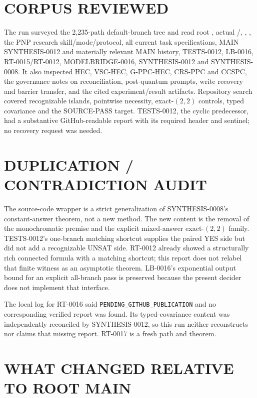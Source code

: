 \documentclass[11pt]{article}
\begin{document}
\section{CORPUS REVIEWED}

The run surveyed the 2,235-path default-branch tree and read root
, actual /, ,
, the PNP research skill/mode/protocol, all current task
specifications, MAIN SYNTHESIS-0012 and materially relevant MAIN history,
TESTS-0012, LB-0016, RT-0015/RT-0012, MODELBRIDGE-0016, SYNTHESIS-0012 and
SYNTHESIS-0008.  It also inspected HEC, VSC-HEC, G-PPC-HEC, CRS-PPC and CCSPC,
the governance notes on reconciliation, post-quantum prompts, write recovery
and barrier transfer, and the cited experiment/result artifacts.  Repository
search covered recognizable islands, pointwise necessity, exact-$(2,2)$
controls, typed covariance and the SOURCE-PASS target.  TESTS-0012, the cyclic
predecessor, had a substantive GitHub-readable report with its required header
and sentinel; no recovery request was needed.

\section{DUPLICATION / CONTRADICTION AUDIT}

The source-code wrapper is a strict generalization of SYNTHESIS-0008's
constant-answer theorem, not a new method.  The new content is the removal of
the monochromatic premise and the explicit mixed-answer exact-$(2,2)$ family.
TESTS-0012's one-branch matching shortcut supplies the paired YES side but did
not add a recognizable UNSAT side.  RT-0012 already showed a structurally rich
connected formula with a matching shortcut; this report does not relabel that
finite witness as an asymptotic theorem.  LB-0016's exponential output bound
for an explicit all-branch pass is preserved because the present decider does
not implement that interface.

The local log for RT-0016 said \texttt{PENDING\_GITHUB\_PUBLICATION} and no
corresponding verified report was found.  Its typed-covariance content was
independently reconciled by SYNTHESIS-0012, so this run neither reconstructs nor
claims that missing report.  RT-0017 is a fresh path and theorem.

\section{WHAT CHANGED RELATIVE TO ROOT MAIN}
\end{document}
